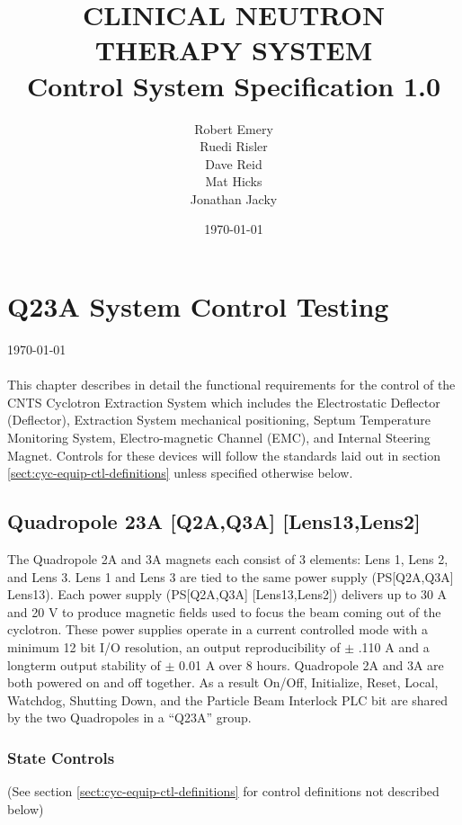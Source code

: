 \documentclass[11pt]{book}		%
\title{CLINICAL NEUTRON THERAPY SYSTEM\\
	Control System Specification 1.0\\[1.0cm]}
\author{Robert Emery\\
	Ruedi Risler\\
	Dave Reid \\
	Mat Hicks \\
        Jonathan Jacky}
\date{\today}
\begin{document}
\chapter{Q23A System Control Testing} \label{ch:cyc-equip-ctl-beamline}

\vspace*{-.75in}
\today \\
\vspace*{.75in}
\\

This chapter describes in detail the functional requirements for the control of the CNTS Cyclotron Extraction System which includes the Electrostatic Deflector (Deflector), Extraction System mechanical positioning, Septum Temperature Monitoring System, Electro-magnetic Channel (EMC), and Internal Steering Magnet.  Controls for these devices will follow the standards laid out in section \ref{sect:cyc-equip-ctl-definitions} unless specified otherwise below.

\section{Quadropole 23A [Q2A,Q3A] [Lens13,Lens2]} \label{sect:cyc-equip-ctl-beamline-quad23a}

The Quadropole 2A and 3A magnets each consist of 3 elements: Lens 1, Lens 2, and Lens 3. Lens 1 and Lens 3 are tied to the same power supply (PS[Q2A,Q3A] Lens13). Each power supply (PS[Q2A,Q3A] [Lens13,Lens2]) delivers up to 30 A and 20 V to produce magnetic fields used to focus the beam coming out of the cyclotron.  These power supplies operate in a current controlled mode with a minimum 12 bit I/O resolution, an output reproducibility of $\pm$ .110 A and a longterm output stability of $\pm$ 0.01 A over 8 hours. Quadropole 2A and 3A are both powered on and off together. As a result On/Off, Initialize, Reset, Local, Watchdog, Shutting Down, and the Particle Beam Interlock PLC bit are shared by the two Quadropoles in a ``Q23A'' group.

\subsection{State Controls} \label{sect:cyc-equip-ctl-beamline-q23a-state-controls}
(See section \ref{sect:cyc-equip-ctl-definitions} for control definitions not described below)
\end{document}
